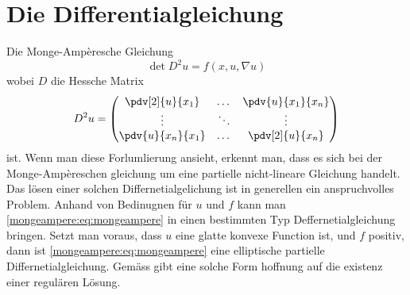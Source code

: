 %
%
%
%
\section{Die Differentialgleichung\label{mongeampere:section:teil0}}
Die Monge-Ampèresche Gleichung
\begin{equation}
  \det D^2 u = f(x, u, \nabla u)
  \label{mongeampere:eq:mongeampere}
\end{equation}
wobei $D$ die Hessche Matrix
\begin{equation}
  D^2 u =
  \begin{pmatrix}
    \pdv[2]{u}{x_1} & \dots &\pdv{u}{x_1}{x_n} \\
  \vdots & \ddots & \vdots \\
  \pdv{u}{x_n}{x_1} & \dots &\pdv[2]{u}{x_n} \\
  \end{pmatrix}
  \label{mongeampere:eq:hess}
\end{equation}
ist.
Wenn man diese Forlumlierung ansieht, erkennt man, dass es sich bei der Monge-Ampèreschen gleichung um eine partielle
nicht-lineare Gleichung handelt.
Das lösen einer solchen Differnetialgelichung ist in generellen ein anspruchvolles Problem.
Anhand von Bedinugnen für $u$ und $f$ kann man \eqref{mongeampere:eq:mongeampere} 
in einen bestimmten Typ Deffernetialgleichung bringen.
Setzt man voraus, dass $u$ eine glatte konvexe Function ist, und $f$ positiv, dann ist \eqref{mongeampere:eq:mongeampere}
eine elliptische partielle Differnetialgleichung.
Gemäss \cite{figalli2018mongeampereequation} gibt eine solche Form hoffnung auf die existenz einer regulären Lösung.

